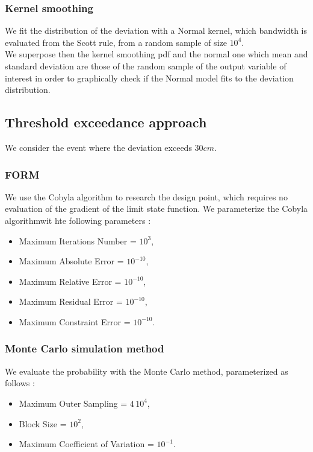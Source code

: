 \documentclass[11pt]{article}
\begin{document}
\subsubsection{Kernel smoothing}

We fit the distribution of the deviation with a Normal kernel, which bandwidth is evaluated from the Scott rule, from a random sample of size $10^4$.\\
We superpose then the kernel smoothing pdf and the normal one which mean and standard deviation are those of the random sample of the output variable of interest in order to graphically check if the Normal model fits to the deviation distribution.

\subsection{Threshold exceedance approach}

We consider the event where the deviation exceeds $30 cm$.\\

\subsubsection{FORM}

We use the Cobyla algorithm to research the design point, which requires no evaluation of the gradient of the limit state function. We parameterize the Cobyla algorithmwit hte following parameters :
\begin{itemize}
\item Maximum Iterations Number = $10^3$,
\item Maximum Absolute Error = $10^{-10}$,
\item Maximum Relative Error = $10^{-10}$,
\item Maximum Residual Error = $10^{-10}$,
\item Maximum Constraint Error = $10^{-10}$.
\end{itemize}


\subsubsection{Monte Carlo simulation method}

We evaluate the probability with the Monte Carlo method, parameterized as follows :
\begin{itemize}
\item Maximum Outer Sampling = $4\, 10^4$,
\item Block Size = $10^2$,
\item Maximum Coefficient of Variation = $10^{-1}$.
\end{itemize}
\end{document}
